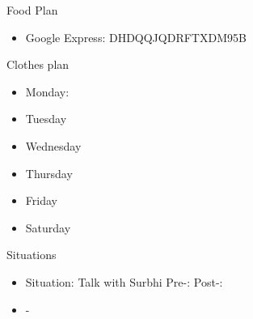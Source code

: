 \documentclass[serif, mathserif, final]{beamer}
\begin{document}
\begin{frame}
\begin{columns}
\begin{column}{0.25\linewidth}
  \begin{block}{Food Plan} 
    \begin{itemize}
      \tiny \item \tiny Google Express: DHDQQJQDRFTXDM95B
    \end{itemize}
  \end{block} 
  \begin{block}{Clothes plan} 
    \begin{itemize}
      \tiny \item \tiny Monday: 
    \item \tiny Tuesday
    \item \tiny Wednesday
    \item \tiny Thursday
    \item \tiny Friday
    \item \tiny Saturday
    \end{itemize} 
  \end{block} 

  \begin{block}{Situations}
    \begin{itemize}
      \tiny \item \tiny Situation: Talk with Surbhi Pre-:  Post-:   
      \item \tiny -
    \end{itemize} 
  \end{block} 
\end{column} 
  \end{columns}
\end{frame}
\end{document}
